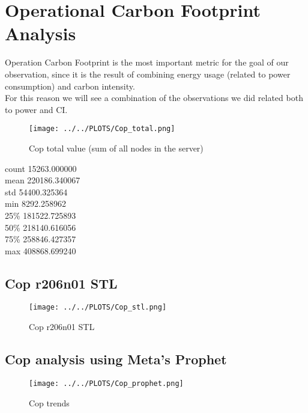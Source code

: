 \section{Operational Carbon Footprint Analysis}
Operation Carbon Footprint is the most important metric for the goal of our observation, since it is the result of combining energy usage (related to power consumption) and carbon intensity. \\
For this reason we will see a combination of the observations we did related both to power and CI.

\vspace{-15pt}

\begin{figure}[H]
\centering
\texttt{[image: ../../PLOTS/Cop\_total.png]}
\captionsetup{skip=-10pt}
\caption{Cop total value (sum of all nodes in the server)}
\label{fig:Cop_total}
\end{figure}

\begin{center}
count     15263.000000 \\
mean     220186.340067 \\
std       54400.325364 \\
min        8292.258962 \\
25\%      181522.725893 \\
50\%      218140.616056 \\
75\%      258846.427357 \\
max      408868.699240   
\end{center}

\subsection{Cop r206n01 STL}

\vspace{-10pt}

\begin{figure}[H]
\centering
\texttt{[image: ../../PLOTS/Cop\_stl.png]}
\caption{Cop r206n01 STL}
\label{fig:Cop_r206n01_stl}
\end{figure}

\subsection{Cop analysis using Meta's Prophet}


\vspace{-10pt}

\begin{figure}[H]
\centering
\texttt{[image: ../../PLOTS/Cop\_prophet.png]}
\caption{Cop trends}
\label{fig:Cop_prophet}
\end{figure}